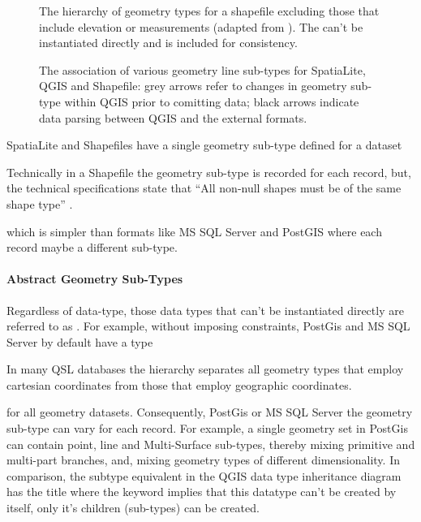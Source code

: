 \documentclass[letterpaper,11pt,english]{sphinxmanual}
\begin{document}
\begin{figure}[htbp]
\centering
\capstart

\noindent{}
\caption{The hierarchy of geometry types for a shapefile excluding those that include elevation or measurements (adapted from ).  The  can’t be instantiated directly and is included for consistency.}\label{\detokenize{concept:id60}}\label{\detokenize{concept:figureshapehier}}\end{figure}

\begin{figure}[htbp]
\centering
\capstart

\noindent{}
\caption{The association of various geometry line sub-types for SpatiaLite, QGIS and Shapefile: grey arrows refer to changes in geometry sub-type within QGIS prior to comitting data; black arrows indicate data parsing between QGIS and the external formats.}\label{\detokenize{concept:id61}}\label{\detokenize{concept:figureshapetoqgis}}\end{figure}

SpatiaLite and Shapefiles have a single geometry sub-type defined for a dataset %
\begin{footnote}[8]\sphinxAtStartFootnote
Technically in a Shapefile the geometry sub-type is recorded for each record, but, the technical specifications state that “All non-null shapes must be of the same shape type” .
%
\end{footnote} which is simpler than formats like MS SQL Server and PostGIS where each record maybe a different sub-type.


\paragraph{Abstract Geometry Sub-Types}
\label{\detokenize{concept:abstract-geometry-sub-types}}
Regardless of data-type, those data types that can’t be instantiated directly are referred to as .
For example, without imposing constraints, PostGis and MS SQL Server by default have a  type %
\begin{footnote}[4]\sphinxAtStartFootnote
In many QSL databases the hierarchy separates all geometry types that employ cartesian coordinates from those that employ geographic coordinates.
%
\end{footnote} for all geometry datasets. Consequently, PostGis or MS SQL Server the geometry sub-type can vary for each record.  For example, a single geometry set in PostGis can contain point, line and Multi-Surface sub-types, thereby mixing primitive and multi-part branches, and, mixing geometry types of different dimensionality.  In comparison, the  subtype equivalent in the QGIS data type inheritance diagram  has the title  where the  keyword implies that this datatype can’t be created by itself, only it’s children (sub-types) can be created.
\end{document}
